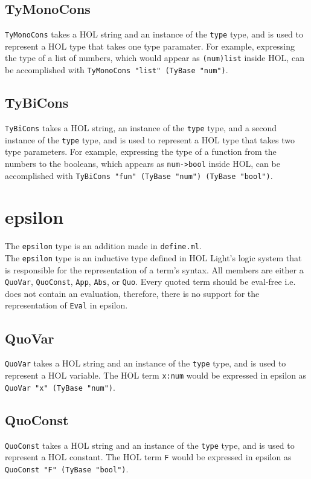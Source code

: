 \documentclass{article}
\def\c#1{\texttt{#1}}
\begin{document}
\subsection{TyMonoCons}
\c{TyMonoCons} takes a HOL string and an instance of the \c{type} type, and is used to represent a HOL type that takes one type paramater. For example, expressing the type of a list of numbers, which would appear as \c{(num)list} inside HOL, can be accomplished with \c{TyMonoCons "list" (TyBase "num")}.

\subsection{TyBiCons}
\c{TyBiCons} takes a HOL string, an instance of the \c{type} type, and a second instance of the \c{type} type, and is used to represent a HOL type that takes two type parameters. For example, expressing the type of a function from the numbers to the booleans, which appears as \c{num->bool} inside HOL, can be accomplished with \c{TyBiCons "fun" (TyBase "num") (TyBase "bool")}.

\newpage

\section{epsilon}
The \c{epsilon} type is an addition made in \c{define.ml}.\\
The \c{epsilon} type is an inductive type defined in HOL Light's logic system that is responsible for the representation of a term's syntax. All members are either a \c{QuoVar}, \c{QuoConst}, \c{App}, \c{Abs}, or \c{Quo}. Every quoted term should be eval-free i.e. does not contain an evaluation, therefore, there is no support for the representation of \c{Eval} in epsilon.

\subsection{QuoVar}
\c{QuoVar} takes a HOL string and an instance of the \c{type} type, and is used to represent a HOL variable. The HOL term \c{x:num} would be expressed in epsilon as \c{QuoVar "x" (TyBase "num")}.

\subsection{QuoConst}
\c{QuoConst} takes a HOL string and an instance of the \c{type} type, and is used to represent a HOL constant. The HOL term \c{F} would be expressed in epsilon as \c{QuoConst "F" (TyBase "bool")}.
\end{document}
